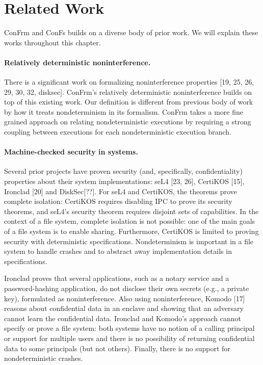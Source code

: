 \section{Related Work}

ConFrm and ConFs builds on a diverse body of prior work. We will explain these works throughout this chapter. 

\paragraph{Relatively deterministic noninterference.} There is a significant work on formalizing noninterference properties [19, 25, 26, 29, 30, 32, disksec]. ConFrm's relatively deterministic noninterference builds on top of this existing work. Our definition is different from previous body of work by how it treats nondeterminism in its formalism. ConFrm takes a more fine grained approach on relating nondeterministic executions by requiring a strong coupling between executions for each nondeterministic execution branch.

\paragraph{Machine-checked security in systems.} 
Several prior
projects have proven security (and, specifically, confidentiality) properties about their system implementations:
seL4 [23, 26], CertiKOS [15], Ironclad [20] and DiskSec[??]. For
seL4 and CertiKOS, the theorems prove complete isolation: CertiKOS requires disabling IPC to prove its security
theorems, and seL4’s security theorem requires disjoint
sets of capabilities. In the context of a file system, complete isolation is not possible: one of the main goals of a
file system is to enable sharing. Furthermore, CertiKOS
is limited to proving security with deterministic specifications. Nondeterminism is important in a file system
to handle crashes and to abstract away implementation
details in specifications.

Ironclad proves that several applications, such as a notary service and a password-hashing application, do not
disclose their own secrets (e.g., a private key), formulated as noninterference. Also using noninterference, Komodo [17] reasons about confidential data in an enclave
and showing that an adversary cannot learn the confidential data. Ironclad and Komodo’s approach cannot specify
or prove a file system: both systems have no notion of a
calling principal or support for multiple users and there
is no possibility of returning confidential data to some
principals (but not others). Finally, there is no support for
nondeterministic crashes.

